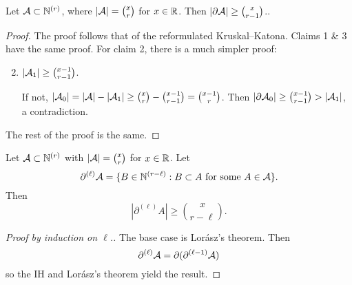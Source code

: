 \begin{theorem}
Let $\mathcal{A}\subset \mathbb{N}^{(r)}$, where $|\mathcal{A}| = {x\choose r}$ for $x\in \mathbb{R}$.
Then $|\partial \mathcal{A}| \geq {x\choose r-1}$..
\end{theorem}
\begin{proof}	
The proof follows that of the reformulated Kruskal--Katona. Claims 1 \& 3 have the same proof. For claim 2, there is a much simpler proof:
\begin{enumerate}[{Claim }1.]\setcounter{enumi}{1}
\item $|\mathcal{A}_1|\geq {x-1\choose r-1}$.
\begin{subproof}	
If not, $|\mathcal{A}_0| = |\mathcal{A}| - |\mathcal{A}_1| \geq {x\choose r} - {x-1 \choose r-1} = {x-1\choose r}$. Then $|\partial \mathcal{A}_0| \geq {x-1\choose r-1} > |\mathcal{A}_1|$, a contradiction.
\end{subproof}
\end{enumerate}
The rest of the proof is the same.
\end{proof}


\begin{corollary} \label{cor:ell_shadows}
Let $\mathcal{A}\subset \mathbb{N}^{(r)}$ with $|\mathcal{A}| = {x\choose r}$ for $x\in \mathbb{R}$. Let 
\[
\partial^{(\ell)}\mathcal{A} = \{B\in \mathbb{N}^{(r-\ell)}: B\subset A \text{ for some }A\in\mathcal{A}\}.
\]
Then
\[
|\partial^{(\ell)}A|\geq {x\choose r-\ell}.
\]
\end{corollary}
\begin{proof}[Proof by induction on $\ell$.] The base case is Lor\'asz's theorem. Then
\[
\partial^{(\ell)}\mathcal{A} = \partial ( \partial^{(\ell-1)}\mathcal{A})
\]
so the IH and Lor\'asz's theorem yield the result.
\end{proof}

